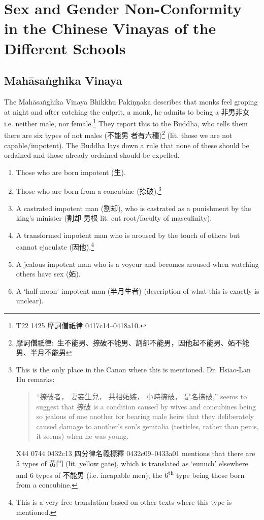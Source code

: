 \section{Sex and Gender Non-Conformity in the Chinese Vinayas of the Different Schools}
\label{appendix1}

\subsection{Mahāsaṅghika Vinaya}
The Mahāsaṅghika Vinaya Bhikkhu Pakiṇṇaka describes that monks feel groping at night and after catching the culprit, a monk, he admits to being a 非男非女 i.e. neither male, nor female.\footnote{T22 1425 摩訶僧祇律 0417c14–0418a10.} They report this to the Buddha, who tells them there are six types of not males (不能男 者有六種)\footnote{摩訶僧祇律: 生不能男、捺破不能男、割卻不能男，因他起不能男、妬不能男、半月不能男} (lit. those we are not capable/impotent). The Buddha lays down a rule that none of these should be ordained and those already ordained should be expelled.

\begin{enumerate}
\item Those who are born impotent (生). 
\item Those who are born from a concubine (捺破).\footnote{This is the only place in the Canon where this is mentioned. Dr. Hsiao-Lan Hu remarks: 
\begin{quote}
``捺破者， 妻妾生兒， 共相妬嫉， 小時捺破， 是名捺破,'' seems to suggest that 捺破 is a condition caused by wives and concubines being so jealous of one another for bearing male heirs that they deliberately caused damage to another's son's genitalia (testicles, rather than penis, it seems) when he was young.  
\end{quote}
X44 0744 0432c13 四分律名義標釋 0432c09–0433a01 mentions that there are 5 types of 黃門 (lit. yellow gate), which is translated as `eunuch' elsewhere and 6 types of 不能男 (i.e. incapable men), the 6\textsuperscript{th} type being those born from a concubine.}
\item A castrated impotent man (割却), who is castrated as a punishment by the king's minister (割却 男根 lit. cut root/faculty of masculinity).
\item A transformed impotent man who is aroused by the touch of others but cannot ejaculate (因他).\footnote{This is a very free translation based on other texts where this type is mentioned.}
\item A jealous impotent man who is a voyeur and becomes aroused when watching others have sex (妬).
\item A `half-moon' impotent man (半月生者) (description of what this is exactly is unclear).
\end{enumerate}

